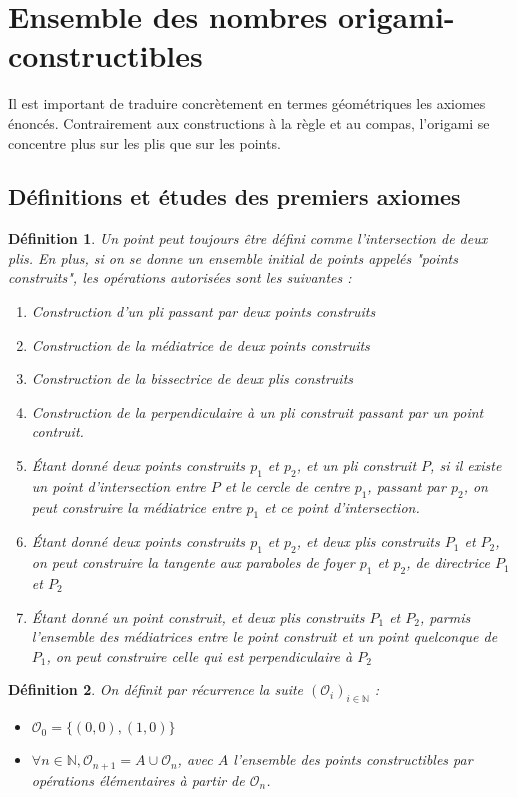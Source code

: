 \documentclass[a4paper,12pt,french,draft]{report}
\newtheorem{definition}{Définition}[section]
\begin{document}
\section{Ensemble des nombres origami-constructibles}
			Il est important de traduire concrètement en termes géométriques les axiomes énoncés. Contrairement aux constructions à la règle et au compas, l'origami se concentre plus sur les plis que sur les points.

	
\subsection{Définitions et études des premiers axiomes}

			\begin{definition}
			Un point peut toujours être défini comme l'intersection de deux plis. En plus, si on se donne un ensemble initial de points appelés "points construits", les opérations autorisées sont les suivantes : 
				\begin{enumerate}
					\item Construction d'un pli passant par deux points construits
					\item Construction de la médiatrice de deux points construits
					\item Construction de la bissectrice de deux plis construits
					\item Construction de la perpendiculaire à un pli construit passant par un point contruit.
					\item Étant donné deux points construits $p_{1}$ et $p_{2}$, et un pli construit $P$, si il existe un point d'intersection entre $P$ et le cercle de centre $p_{1}$, passant par $p_{2}$, on peut construire la médiatrice entre $p_{1}$ et ce point d'intersection.
					\item Étant donné deux points construits $p_{1}$ et $p_{2}$, et deux plis construits $P_{1}$ et $P_{2}$, on peut construire la tangente aux paraboles de foyer $p_{1}$ et $p_{2}$, de directrice $P_{1}$ et $P_{2}$
					\item Étant donné un point construit, et deux plis construits $P_{1}$ et $P_{2}$, parmis l'ensemble des médiatrices entre le point construit et un point quelconque de $P_{1}$, on peut construire celle qui est perpendiculaire à $P_{2}$
				\end{enumerate}
			\end{definition}

			\begin{definition}
				On définit par récurrence la suite \((\mathcal{O}_i)_{i \in \mathbb{N}} \) :
				\begin{itemize}
					\item \(\mathcal{O}_0 = \{(0, 0), (1, 0)\}\)
					\item \(\forall n \in \mathbb{N}, \mathcal{O}_{n+1} = A\cup \mathcal{O}_{n}\), avec \(A\) l'ensemble des points constructibles par opérations élémentaires à partir de \( \mathcal{O}_{n} \).
				\end{itemize}
			\end{definition}
\end{document}
